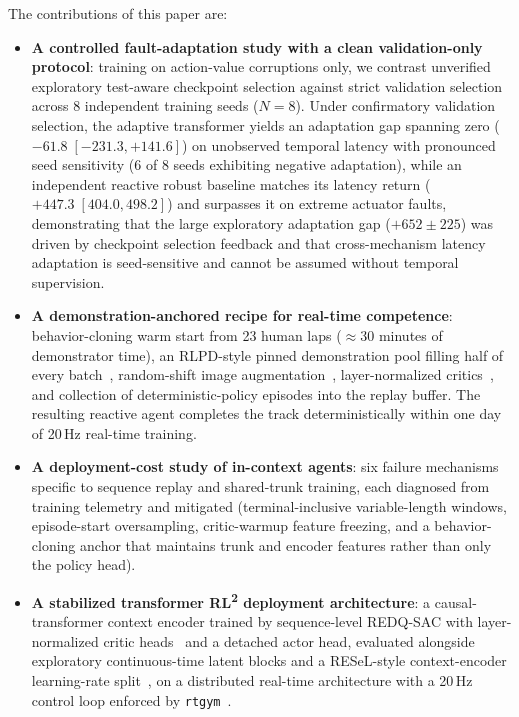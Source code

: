 \documentclass[conference]{IEEEtran}
\newcommand{\rltwo}{\texorpdfstring{RL\textsuperscript{2}}{RL2}}
\begin{document}
The contributions of this paper are:
\begin{itemize}
    \item \textbf{A controlled fault-adaptation study with a clean validation-only protocol}: training on action-value corruptions only, we contrast unverified exploratory test-aware checkpoint selection against strict validation selection across 8 independent training seeds ($N=8$). Under confirmatory validation selection, the adaptive transformer yields an adaptation gap spanning zero ($-61.8 \; [-231.3, +141.6]$) on unobserved temporal latency with pronounced seed sensitivity (6 of 8 seeds exhibiting negative adaptation), while an independent reactive robust baseline matches its latency return ($+447.3 \; [404.0, 498.2]$) and surpasses it on extreme actuator faults, demonstrating that the large exploratory adaptation gap ($+652 \pm 225$) was driven by checkpoint selection feedback and that cross-mechanism latency adaptation is seed-sensitive and cannot be assumed without temporal supervision.
    \item \textbf{A demonstration-anchored recipe for real-time competence}: behavior-cloning warm start from 23 human laps ($\approx$30 minutes of demonstrator time), an RLPD-style pinned demonstration pool filling half of every batch~\cite{rlpd}, random-shift image augmentation~\cite{drq}, layer-normalized critics~\cite{droq}, and collection of deterministic-policy episodes into the replay buffer. The resulting reactive agent completes the track deterministically within one day of 20\,Hz real-time training.
    \item \textbf{A deployment-cost study of in-context agents}: six failure mechanisms specific to sequence replay and shared-trunk training, each diagnosed from training telemetry and mitigated (terminal-inclusive variable-length windows, episode-start oversampling, critic-warmup feature freezing, and a behavior-cloning anchor that maintains trunk and encoder features rather than only the policy head).
    \item \textbf{A stabilized transformer \rltwo{} deployment architecture}: a causal-transformer context encoder trained by sequence-level REDQ-SAC with layer-normalized critic heads~\cite{droq} and a detached actor head, evaluated alongside exploratory continuous-time latent blocks and a RESeL-style context-encoder learning-rate split~\cite{resel}, on a distributed real-time architecture with a 20\,Hz control loop enforced by \texttt{rtgym}~\cite{rtgym,tmrl}.
\end{itemize}
\end{document}
